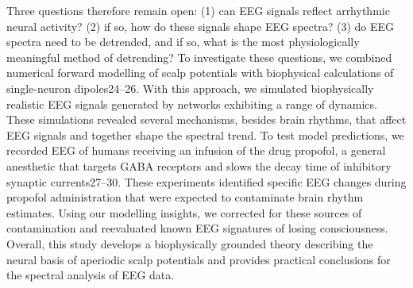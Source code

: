 Three questions therefore remain open: (1) can EEG signals reflect arrhythmic neural activity? (2) if so, how do these signals shape EEG spectra? (3) do EEG spectra need to be detrended, and if so, what is the most physiologically meaningful method of detrending? To investigate these questions, we combined numerical forward modelling of scalp potentials with biophysical calculations of single-neuron dipoles24–26. With this approach, we simulated biophysically realistic EEG signals generated by networks exhibiting a range of dynamics. These simulations revealed several mechanisms, besides brain rhythms, that affect EEG signals and together shape the spectral trend. To test model predictions, we recorded EEG of humans receiving an infusion of the drug propofol, a general anesthetic that targets GABA receptors and slows the decay time of inhibitory synaptic currents27–30. These experiments identified specific EEG changes during propofol administration that were expected to contaminate brain rhythm estimates. Using our modelling insights, we corrected for these sources of contamination and reevaluated known EEG signatures of losing consciousness. Overall, this study develops a biophysically grounded theory describing the neural basis of aperiodic scalp potentials and provides practical conclusions for the spectral analysis of EEG data.

